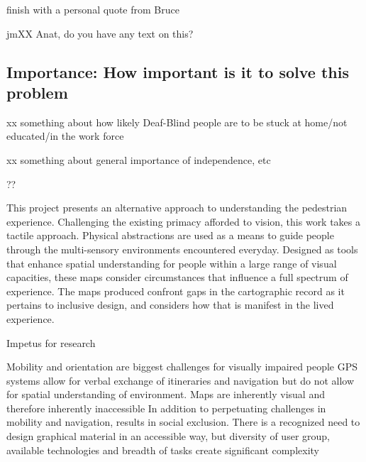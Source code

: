 \ac{finish with a personal quote from Bruce}



jm{XX Anat, do you have any text on this?}

\subsection{Importance: How important is it to solve this problem }


xx something about how likely Deaf-Blind people are to be stuck at home/not educated/in the work force

xx something about general importance of independence, etc

??


This project presents an alternative approach to understanding the pedestrian experience. Challenging the existing primacy afforded to vision, this work takes a tactile approach. Physical abstractions are used as a means to guide people through the multi-sensory environments encountered everyday. Designed as tools that enhance spatial understanding for people within a large range of visual capacities, these maps consider circumstances that influence a full spectrum of experience. The maps produced confront gaps in the cartographic record as it pertains to inclusive design, and considers how that is manifest in the lived experience.

Impetus for research 

\ac{Mobility and orientation are biggest challenges for visually impaired people
GPS systems allow for verbal exchange of itineraries and navigation but do not allow for spatial understanding of environment. 
Maps are inherently visual and therefore inherently inaccessible
In addition to perpetuating challenges in mobility and navigation, results in social exclusion. There is a recognized need to design graphical material in an accessible way, but diversity of user group, available technologies and breadth of tasks create significant complexity 
}
